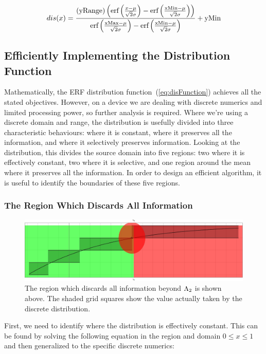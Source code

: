 \begin{equation}\label{eq:disFunction}
  dis(x) = \frac{(\text{yRange}) \left(\text{erf}\left(\frac{x-\mu }{\sqrt{2} \sigma }\right)-\text{erf}\left(\frac{\text{xMin}-\mu }{\sqrt{2} \sigma }\right)\right)}{\text{erf}\left(\frac{\text{xMax}-\mu }{\sqrt{2} \sigma }\right)-\text{erf}\left(\frac{\text{xMin}-\mu }{\sqrt{2} \sigma }\right)}+\text{yMin}
\end{equation}


\subsection{Efficiently Implementing the Distribution Function}
Mathematically, the ERF distribution function~(\ref{eq:disFunction}) achieves all the stated objectives. However, on a device we are dealing with discrete numerics and limited processing power, so further analysis is required. Where we're using a discrete domain and range, the distribution is usefully divided into three characteristic behaviours:  where it is constant, where it preserves all the information, and where it selectively preserves information. Looking at the distribution, this divides the source domain into five regions: two where it is effectively constant, two where it is selective, and one region around the mean where it preserves all the information. In order to design an efficient algorithm, it is useful to identify the boundaries of these five regions.


\subsubsection{The Region Which Discards All Information}
\begin{figure}[h]
\centering
\includegraphics[width=0.7\linewidth]{Chapter2/Figs/EffectivlyConstantRange}
\caption{The region which discards all information beyond $\Lambda_2$ is shown above. The shaded grid squares show the value actually taken by the discrete distribution.}
\label{fig:EffectivlyConstantRange}
\end{figure}


First, we need to identify where the distribution is effectively constant. This can be found by solving the following equation in the region and domain $0 \le x \le 1$ and then generalized to the specific discrete numerics:

